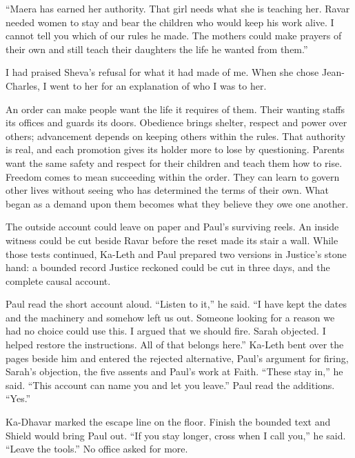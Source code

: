 ``Maera has earned her authority. That girl needs what she is teaching her. Ravar needed women to stay and bear the children who would keep his work alive. I cannot tell you which of our rules he made. The mothers could make prayers of their own and still teach their daughters the life he wanted from them.''\par

I had praised Sheva's refusal for what it had made of me. When she chose Jean-Charles, I went to her for an explanation of who I was to her.\par

An order can make people want the life it requires of them. Their wanting staffs its offices and guards its doors. Obedience brings shelter, respect and power over others; advancement depends on keeping others within the rules. That authority is real, and each promotion gives its holder more to lose by questioning. Parents want the same safety and respect for their children and teach them how to rise. Freedom comes to mean succeeding within the order. They can learn to govern other lives without seeing who has determined the terms of their own. What began as a demand upon them becomes what they believe they owe one another.\par

\ornament

The outside account could leave on paper and Paul's surviving reels. An inside witness could be cut beside Ravar before the reset made its stair a wall. While those tests continued, Ka-Leth and Paul prepared two versions in Justice's stone hand: a bounded record Justice reckoned could be cut in three days, and the complete causal account.\par

Paul read the short account aloud. ``Listen to it,'' he said. ``I have kept the dates and the machinery and somehow left us out. Someone looking for a reason we had no choice could use this. I argued that we should fire. Sarah objected. I helped restore the instructions. All of that belongs here.'' Ka-Leth bent over the pages beside him and entered the rejected alternative, Paul's argument for firing, Sarah's objection, the five assents and Paul's work at Faith. ``These stay in,'' he said. ``This account can name you and let you leave.'' Paul read the additions. ``Yes.''\par

Ka-Dhavar marked the escape line on the floor. Finish the bounded text and Shield would bring Paul out. ``If you stay longer, cross when I call you,'' he said. ``Leave the tools.'' No office asked for more.\par

